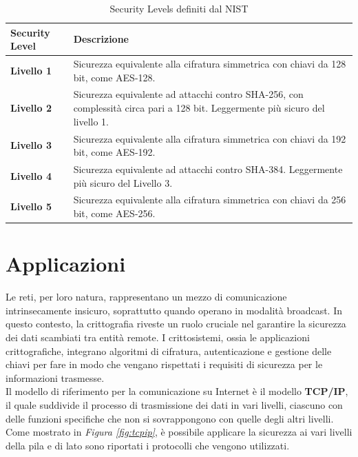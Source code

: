\begin{table}[ht]
    \centering
    \begin{tabular}{>{\centering\arraybackslash}m{3cm}p{10cm}}
        \toprule
        \textbf{Security Level} & \textbf{Descrizione} \\
        \midrule
        \textbf{Livello 1} & Sicurezza equivalente alla cifratura simmetrica con chiavi da 128 bit, come AES-128.\\
        \textbf{Livello 2} & Sicurezza equivalente ad attacchi contro SHA-256, con complessità circa pari a 128 bit. Leggermente più sicuro del livello 1. \\
        \textbf{Livello 3} & Sicurezza equivalente alla cifratura simmetrica con chiavi da 192 bit, come AES-192. \\
        \textbf{Livello 4} & Sicurezza equivalente ad attacchi contro SHA-384. Leggermente più sicuro del Livello 3. \\
        \textbf{Livello 5} & Sicurezza equivalente alla cifratura simmetrica con chiavi da 256 bit, come AES-256. \\
        \hline
    \end{tabular}
    \caption{Security Levels definiti dal NIST}
    \label{tab:security-levels}
\end{table}

\newpage
\section{Applicazioni}

Le reti, per loro natura, rappresentano un mezzo di comunicazione
intrinsecamente insicuro, soprattutto quando operano in modalità broadcast. In
questo contesto, la crittografia riveste un ruolo cruciale nel garantire la
sicurezza dei dati scambiati tra entità remote. I crittosistemi, ossia le
applicazioni crittografiche, integrano algoritmi di cifratura, autenticazione e
gestione delle chiavi per fare in modo che vengano rispettati i requisiti di sicurezza 
per le informazioni trasmesse.\\ 

\noindent
Il modello di riferimento per la comunicazione su Internet è il modello \textbf{TCP/IP}, il quale  suddivide il processo di trasmissione dei dati
in vari livelli, ciascuno con delle funzioni specifiche che non si sovrappongono con quelle degli altri livelli. Come mostrato in \textit{Figura \ref{fig:tcpip}},
è possibile applicare la sicurezza ai vari livelli della pila e di lato sono riportati i protocolli che vengono utilizzati. 

